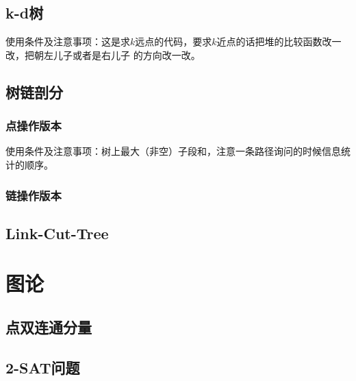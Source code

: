 \documentclass[landscape, oneside, a4paper, cs4size]{book}
\begin{document}
\begin{multicols}{2}
			\section{k-d树}
			\begin{spacing}{0.8}
				使用条件及注意事项：这是求$k$远点的代码，要求$k$近点的话把堆的比较函数改一改，把朝左儿子或者是右儿子
				的方向改一改。
				
			\end{spacing}
			\section{树链剖分}
			\begin{spacing}{0.8}
				\subsection{点操作版本}
					使用条件及注意事项：树上最大（非空）子段和，注意一条路径询问的时候信息统计的顺序。
					
				\subsection{链操作版本}
					
			\end{spacing}
			\section{Link-Cut-Tree}
			\begin{spacing}{0.8}
				
			\end{spacing}
		\chapter{图论}
			\section{点双连通分量}
			\begin{spacing}{0.8}
				
			\end{spacing}	
			\section{2-SAT问题}
			\begin{spacing}{0.8}
				
			\end{spacing}

\end{multicols}
\end{document}
